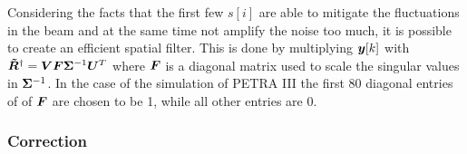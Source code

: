 Considering the facts that the first few $s[i]$ are able to mitigate the fluctuations in the beam and at the same time not amplify the noise too much, it is possible to create an efficient spatial filter. This is done by multiplying $\bm{y}[k]$ with $\bm{\tilde{R}}^{\dagger}=\bm{V}\bm{F}\bm{\Sigma}^{-1}\bm{U}^T$ where $\bm{F}$ is a diagonal matrix used to scale the singular values in $\bm{\Sigma}^{-1}$. In the case of the simulation of PETRA III the first 80 diagonal entries of of $\bm{F}$ are chosen to be 1, while all other entries are 0.

\subsubsection{Correction}









